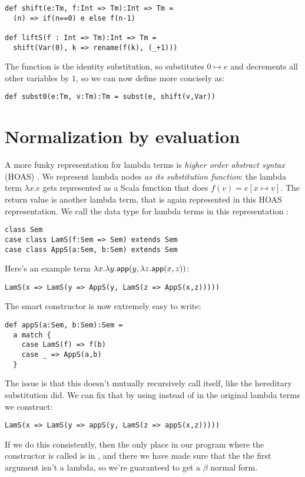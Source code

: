 \begin{lstlisting}
def shift(e:Tm, f:Int => Tm):Int => Tm =
  (n) => if(n==0) e else f(n-1)

def liftS(f : Int => Tm):Int => Tm =
  shift(Var(0), k => rename(f(k), (_+1)))
\end{lstlisting}

The function  is the identity substitution, so  substitutes $0 \mapsto e$ and decrements all other variables by $1$, so we can now define  more concisely as:

\begin{lstlisting}
def subst0(e:Tm, v:Tm):Tm = subst(e, shift(v,Var))
\end{lstlisting}

\section{Normalization by evaluation}

A more funky representation for lambda terms is \emph{higher order abstract syntax} (HOAS) \cite{pfenning88}.
We represent lambda nodes \emph{as its substitution function}: the lambda term $\lambda x. e$ gets represented as a Scala function that does $f(v) = e[x \mapsto v]$.
The return value is another lambda term, that is again represented in this HOAS representation.
We call the data type for lambda terms in this representation :

\begin{lstlisting}
class Sem
case class LamS(f:Sem => Sem) extends Sem
case class AppS(a:Sem, b:Sem) extends Sem
\end{lstlisting}

Here's an example term $\lambda x. \lambda y. \mathsf{app}(y, \lambda z. \mathsf{app}(x,z))$:
\begin{lstlisting}
LamS(x => LamS(y => AppS(y, LamS(z => AppS(x,z)))))
\end{lstlisting}

The smart constructor  is now extremely easy to write:
\begin{lstlisting}
def appS(a:Sem, b:Sem):Sem =
  a match {
    case LamS(f) => f(b)
    case _ => AppS(a,b)
  }
\end{lstlisting}

The issue is that this doesn't mutually recursively call itself, like the hereditary substitution did.
We can fix that by using  instead of  in the original lambda terms we construct:
\begin{lstlisting}
LamS(x => LamS(y => appS(y, LamS(z => appS(x,z)))))
\end{lstlisting}
If we do this consistently, then the only place in our program where the constructor  is called is in , and there we have made sure that the the first argument isn't a lambda, so we're guaranteed to get a $\beta$ normal form.

